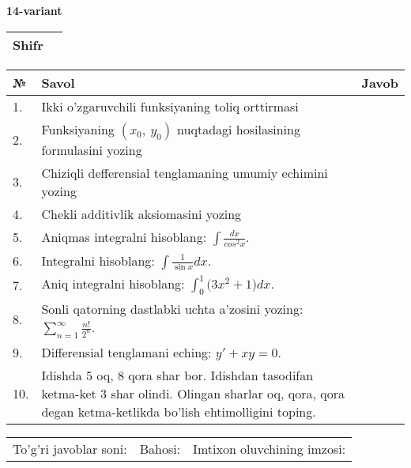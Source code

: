 \documentclass{article}
\begin{document}
  \egroup
  
  \newpage
  
  
  \textbf{14-variant}\\
  
  \bgroup
  \def\arraystretch{1.6} %
  
  \begin{tabular}{|m{5.7cm}|m{9.5cm}|}
  \hline
  Shifr & \\
  \hline
  \end{tabular}
  
  \vspace{1cm}
  
  \begin{tabular}{|m{0.7cm}|m{10cm}|m{4cm}|}
  \hline
  № & Savol & Javob \\
  \hline
  1. & Ikki o'zgaruvchili funksiyaning toliq orttirmasi &  \\
  \hline
  2. & Funksiyaning \((x_{0},\ y_{0})\) nuqtadagi hosilasining formulasini yozing &  \\
  \hline
  3. & Chiziqli defferensial tenglamaning umumiy echimini yozing &  \\
  \hline
  4. & Chekli additivlik aksiomasini yozing &  \\
  \hline
  5. & Aniqmas integralni hisoblang: \(\int \frac{dx}{cos^{2}x}\). &  \\
  \hline
  6. & Integralni hisoblang: \(\int {\frac{1}{\sin x}dx}\). &  \\
  \hline
  7. & Aniq integralni hisoblang: \(\int_{0}^{1}{(3x^{2}} + 1)dx\). &  \\
  \hline
  8. & Sonli qatorning dastlabki uchta a'zosini yozing: \(\sum_{n = 1}^{\infty}\frac{n!}{2^{n}}\). &  \\
  \hline
  9. & Differensial tenglamani eching: \(y' + xy = 0\). &  \\
  \hline
  10. & Idishda 5 oq, 8 qora shar bor. Idishdan tasodifan ketma-ket 3 shar olindi. Olingan sharlar oq, qora, qora degan ketma-ketlikda bo'lish ehtimolligini toping. &  \\
  \hline
  \end{tabular}
  
  \vspace{1cm}
  
  \begin{tabular}{lll}
  To'g'ri javoblar soni: \underline{\hspace{1.5cm}} & 
  Bahosi: \underline{\hspace{1.5cm}} & 
  Imtixon oluvchining imzosi: \underline{\hspace{2cm}} \\
  \end{tabular}
  
\end{document}
